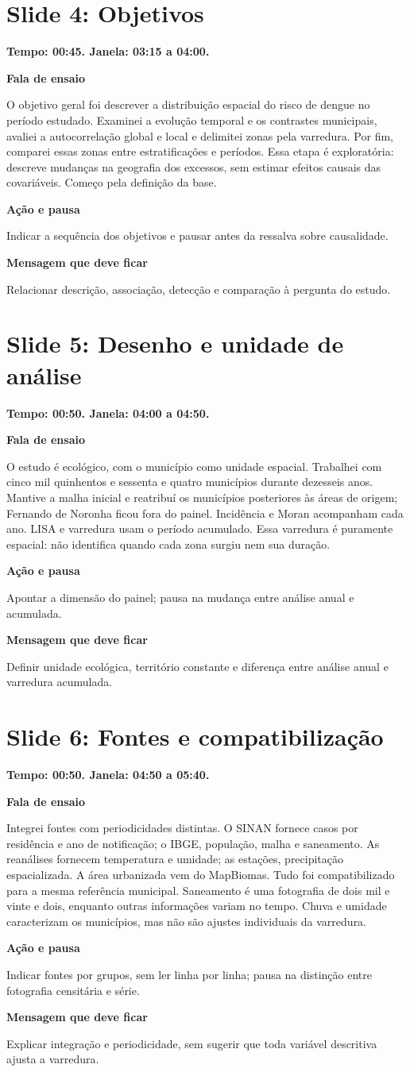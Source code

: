 \documentclass[11pt,a4paper]{article}
\newcommand{\bloco}[1]{\par\Needspace{3\baselineskip}\textbf{#1}\par}
\newcommand{\slide}[2]{\Needspace{13\baselineskip}\section*{Slide #1: #2}}
\begin{document}
\par\begin{minipage}{\textwidth}
\slide{4}{Objetivos}
{\color{azul}\textbf{Tempo: 00:45. Janela: 03:15 a 04:00.}}\par
\bloco{Fala de ensaio}
O objetivo geral foi descrever a distribuição espacial do risco de dengue no período estudado. Examinei a evolução temporal e os contrastes municipais, avaliei a autocorrelação global e local e delimitei zonas pela varredura. Por fim, comparei essas zonas entre estratificações e períodos. Essa etapa é exploratória: descreve mudanças na geografia dos excessos, sem estimar efeitos causais das covariáveis. Começo pela definição da base.
\bloco{Ação e pausa}
Indicar a sequência dos objetivos e pausar antes da ressalva sobre causalidade.
\bloco{Mensagem que deve ficar}
Relacionar descrição, associação, detecção e comparação à pergunta do estudo.
\end{minipage}\par\bigskip
\par\begin{minipage}{\textwidth}
\slide{5}{Desenho e unidade de análise}
{\color{azul}\textbf{Tempo: 00:50. Janela: 04:00 a 04:50.}}\par
\bloco{Fala de ensaio}
O estudo é ecológico, com o município como unidade espacial. Trabalhei com cinco mil quinhentos e sessenta e quatro municípios durante dezesseis anos. Mantive a malha inicial e reatribuí os municípios posteriores às áreas de origem; Fernando de Noronha ficou fora do painel. Incidência e Moran acompanham cada ano. LISA e varredura usam o período acumulado. Essa varredura é puramente espacial: não identifica quando cada zona surgiu nem sua duração.
\bloco{Ação e pausa}
Apontar a dimensão do painel; pausa na mudança entre análise anual e acumulada.
\bloco{Mensagem que deve ficar}
Definir unidade ecológica, território constante e diferença entre análise anual e varredura acumulada.
\end{minipage}\par\bigskip
\par\begin{minipage}{\textwidth}
\slide{6}{Fontes e compatibilização}
{\color{azul}\textbf{Tempo: 00:50. Janela: 04:50 a 05:40.}}\par
\bloco{Fala de ensaio}
Integrei fontes com periodicidades distintas. O SINAN fornece casos por residência e ano de notificação; o IBGE, população, malha e saneamento. As reanálises fornecem temperatura e umidade; as estações, precipitação espacializada. A área urbanizada vem do MapBiomas. Tudo foi compatibilizado para a mesma referência municipal. Saneamento é uma fotografia de dois mil e vinte e dois, enquanto outras informações variam no tempo. Chuva e umidade caracterizam os municípios, mas não são ajustes individuais da varredura.
\bloco{Ação e pausa}
Indicar fontes por grupos, sem ler linha por linha; pausa na distinção entre fotografia censitária e série.
\bloco{Mensagem que deve ficar}
Explicar integração e periodicidade, sem sugerir que toda variável descritiva ajusta a varredura.
\end{minipage}\par\bigskip
\end{document}
